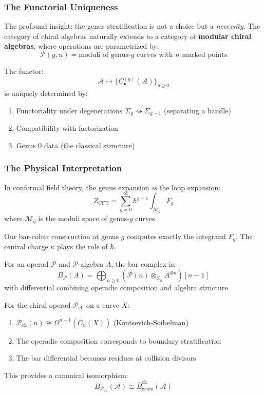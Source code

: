 \subsubsection{The Functorial Uniqueness}

The profound insight: the genus stratification is not a choice but a \emph{necessity}.
The category of chiral algebras naturally extends to a category of \textbf{modular
chiral algebras}, where operations are parametrized by:
$$\mathcal{P}(g,n) = \text{moduli of genus-}g\text{ curves with }n\text{ marked points}$$

The functor:
$$\mathcal{A} \mapsto \{ C_{\bullet}^{(g)}(\mathcal{A}) \}_{g \geq 0}$$
is uniquely determined by:
\begin{enumerate}
\item Functoriality under degenerations $\Sigma_g \rightsquigarrow \Sigma_{g-1}$
(separating a handle)
\item Compatibility with factorization
\item Genus 0 data (the classical structure)
\end{enumerate}

\subsubsection{The Physical Interpretation}

In conformal field theory, the genus expansion \emph{is} the loop expansion:
$$Z_{\text{CFT}} = \sum_{g=0}^{\infty} \hbar^{g-1} \int_{\mathcal{M}_g} F_g$$
where $\mathcal{M}_g$ is the moduli space of genus-$g$ curves.

Our bar-cobar construction at genus $g$ computes exactly the integrand $F_g$.
The central charge $\kappa$ plays the role of $\hbar$.

\begin{theorem}\label{thm:operadic-bar}
For an operad $\mathcal{P}$ and $\mathcal{P}$-algebra $A$, the bar complex is:
$$B_{\mathcal{P}}(A) = \bigoplus_{n \geq 0} (\mathcal{P}(n) \otimes_{\Sigma_n} A^{\otimes n})[n-1]$$
with differential combining operadic composition and algebra structure.
\end{theorem}

\begin{theorem}\label{thm:geometric-bridge}
For the chiral operad $\mathcal{P}_{\text{ch}}$ on a curve $X$:
\begin{enumerate}
\item $\mathcal{P}_{\text{ch}}(n) \cong \Omega^{n-1}(\overline{C}_n(X))$ (Kontsevich-Soibelman)
\item The operadic composition corresponds to boundary stratification
\item The bar differential becomes residues at collision divisors
\end{enumerate}

This provides a canonical isomorphism:
$$B_{\mathcal{P}_{\text{ch}}}(\mathcal{A}) \cong \bar{B}^{\text{ch}}_{\text{geom}}(\mathcal{A})$$
\end{theorem}


